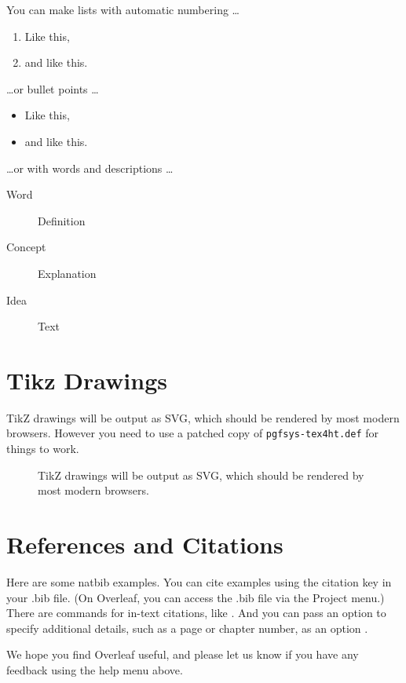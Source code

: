 \documentclass[a4paper]{book}
\begin{document}
You can make lists with automatic numbering \dots

\begin{enumerate}
\item Like this,
\item and like this.
\end{enumerate}
\dots or bullet points \dots
\begin{itemize}
\item Like this,
\item and like this.
\end{itemize}
\dots or with words and descriptions \dots
\begin{description}
\item[Word] Definition
\item[Concept] Explanation
\item[Idea] Text
\end{description}

\section{Tikz Drawings}

TikZ drawings will be output as SVG, which should be rendered by most modern browsers. However you need to use a patched copy of \verb|pgfsys-tex4ht.def| for things to work.

\begin{figure}
\centering
{}
\caption{TikZ drawings will be output as SVG, which should be rendered by most modern browsers.}
\end{figure}

\section{References and Citations}

Here are some natbib examples. You can cite examples using the citation key \citep{TM83} in your .bib file. (On Overleaf, you can access the .bib file via the Project menu.) There are commands for in-text citations, like \citet{GMP81}. And you can pass an option to specify additional details, such as a page or chapter number, as an option \citep[p. 130]{Ful83}.
\bigskip

We hope you find Overleaf useful, and please let us know if you have any feedback using the help menu above.



\end{document}
